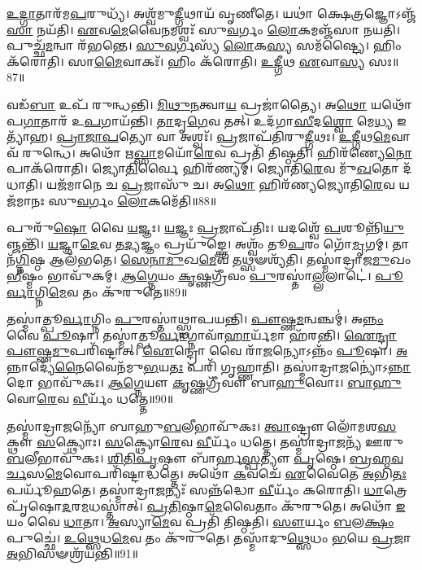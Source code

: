 \-\ul{𑌉}\-\-\ul{𑌦𑍍𑌗𑌾}\-𑌤𑌾𑌰᳴𑌮\-\ul{𑌪}\-𑌰𑍁𑌧𑍍𑌯᳴।
𑌅𑌶𑍍𑌵᳴𑌮𑍁\-\ul{𑌦𑍍𑌗𑍀}\-𑌥𑌾𑌯᳴ 𑌵𑍃𑌣𑍀𑌤𑍇।
𑌯𑌥𑌾॑ 𑌕𑍍𑌷𑍇\-\ul{𑌤𑍍𑌰}\-𑌜𑍍𑌞𑍋\-𑌽𑌞𑍍𑌜᳴\-\ul{𑌸𑌾} 𑌨𑌯᳴𑌤𑌿।
\-\ul{𑌏}\-𑌵\-\ul{𑌮𑍇}\-𑌵𑍈\-\ul{𑌨}\-𑌮𑌶𑍍𑌵𑌃᳴ 𑌸𑍁\-\ul{𑌵}\-𑌰𑍍𑌗𑌂 \ul{𑌲𑍋}\-𑌕𑌮𑌞𑍍𑌜᳴𑌸𑌾 𑌨𑌯𑌤𑌿।
𑌪𑍁𑌚𑍍𑌛᳴\-\ul{𑌮}\-𑌨𑍍𑌵𑌾 𑌰᳴𑌭𑌨𑍍𑌤𑍇।
\-\ul{𑌸𑍁}\-\-\ul{𑌵}\-𑌰𑍍𑌗𑌸𑍍𑌯᳴ \ul{𑌲𑍋}\-𑌕\-\ul{𑌸𑍍𑌯} 𑌸𑌮᳴𑌷𑍍𑌟𑍍𑌯𑍈।
𑌹𑌿𑌂 𑌕᳴𑌰𑍋𑌤𑌿।
𑌸𑌾\-\ul{𑌮𑍈}\-𑌵𑌾𑌕𑌃᳴।
𑌹𑌿𑌂 𑌕᳴𑌰𑍋𑌤𑌿।
\-\ul{𑌉}\-\-\ul{𑌦𑍍𑌗𑍀}\-𑌥 \ul{𑌏}\-𑌵𑌾\-\ul{𑌸𑍍𑌯} 𑌸𑌃॥87॥

𑌵𑌡᳴\-\ul{𑌬𑌾} 𑌉𑌪᳴ 𑌰𑍁𑌨𑍍𑌧𑌨𑍍𑌤𑌿।
\-\ul{𑌮𑌿}\-\-\ul{𑌥𑍁}\-\-\ul{𑌨}\-𑌤𑍍𑌵𑌾\-\ul{𑌯} 𑌪𑍍𑌰𑌜𑌾॑𑌤𑍍𑌯𑍈।
𑌅\-\ul{𑌥𑍋} 𑌯𑌥𑍋᳴𑌪\-\ul{𑌗𑌾}\-𑌤𑌾𑌰᳴ 𑌉\-\ul{𑌪}\-𑌗𑌾𑌯᳴𑌨𑍍𑌤𑌿।
\-\ul{𑌤𑌾}\-𑌦𑍃\-\ul{𑌗𑍇}\-𑌵 𑌤𑌤𑍍।
𑌉𑌦᳴𑌗𑌾\-\ul{𑌸𑍀}\-𑌦\-\ul{𑌶𑍍𑌵𑍋} 𑌮𑍇\-\ul{𑌧𑍍𑌯} 𑌇𑌤𑍍𑌯𑌾᳴𑌹।
\-\ul{𑌪𑍍𑌰𑌾}\-\-\ul{𑌜𑌾}\-\-\ul{𑌪}\-𑌤𑍍𑌯𑍋 𑌵𑌾 𑌅𑌶𑍍𑌵𑌃᳴।
\-\ul{𑌪𑍍𑌰}\-𑌜𑌾𑌪᳴𑌤𑌿𑌰𑍁\-\ul{𑌦𑍍𑌗𑍀}\-𑌥𑌃।
\-\ul{𑌉}\-\-\ul{𑌦𑍍𑌗𑍀}\-𑌥\-\ul{𑌮𑍇}\-𑌵𑌾𑌵᳴ 𑌰𑍁𑌨𑍍𑌧𑍇।
𑌅𑌥𑍋᳴ 𑌋\-\ul{𑌖𑍍𑌸𑌾}\-𑌮𑌯𑍋᳴\-\ul{𑌰𑍇}\-𑌵 𑌪𑍍𑌰𑌤𑌿᳴ 𑌤𑌿𑌷𑍍𑌠𑌤𑌿।
𑌹𑌿𑌰᳴𑌣𑍍𑌯𑍇\-\ul{𑌨𑍋}\-𑌪𑌾𑌕᳴𑌰𑍋𑌤𑌿।
𑌜𑍍𑌯𑍋\-\ul{𑌤𑌿}\-𑌰𑍍𑌵𑍈 𑌹𑌿𑌰᳴𑌣𑍍𑌯𑌮𑍍।
𑌜𑍍𑌯𑍋𑌤𑌿᳴\-\ul{𑌰𑍇}\-𑌵 𑌮𑍁᳴\-\ul{𑌖}\-𑌤𑍋 𑌦᳴𑌧𑌾𑌤𑌿।
𑌯𑌜᳴𑌮𑌾𑌨𑍇 𑌚 \ul{𑌪𑍍𑌰}\-𑌜𑌾𑌸𑍁᳴ 𑌚।
𑌅\-\ul{𑌥𑍋} 𑌹𑌿𑌰᳴𑌣𑍍𑌯𑌜𑍍𑌯𑍋𑌤𑌿\-\ul{𑌰𑍇}\-𑌵 𑌯𑌜᳴𑌮𑌾𑌨𑌃 𑌸𑍁\-\ul{𑌵}\-𑌰𑍍𑌗𑌂 \ul{𑌲𑍋}\-𑌕𑌮𑍇᳴𑌤𑌿॥88॥\anuvakamend[𑌤𑌥𑍍𑌸 \ul{𑌉}\-𑌪𑌾𑌕᳴𑌰𑍋𑌤𑌿 \ul{𑌚}\-𑌤𑍍𑌵𑌾𑌰𑌿᳴ 𑌚]

𑌪𑍁𑌰𑍁᳴\-\ul{𑌷𑍋} 𑌵𑍈 \ul{𑌯}\-𑌜𑍍𑌞𑌃।
\-\ul{𑌯}\-𑌜𑍍𑌞𑌃 \ul{𑌪𑍍𑌰}\-𑌜𑌾\-𑌪᳴𑌤𑌿𑌃।
𑌯𑌦𑌶𑍍𑌵𑍇᳴ \ul{𑌪}\-𑌶𑍂𑌨𑍍𑌨𑌿᳴\-\ul{𑌯𑍁}\-𑌞𑍍𑌜𑌨𑍍𑌤𑌿᳴।
\-\ul{𑌯}\-𑌜𑍍𑌞𑌾\-\ul{𑌦𑍇}\-𑌵 𑌤\-\ul{𑌦𑍍𑌯}\-𑌜𑍍𑌞𑌂 𑌪𑍍𑌰𑌯𑍁᳴𑌙𑍍𑌕𑍍𑌤𑍇।
𑌅𑌶𑍍𑌵𑌂᳴ 𑌤𑍂\-\ul{𑌪}\-𑌰𑌂 𑌗𑍋᳴\-\ul{𑌮𑍃}\-𑌗𑌮𑍍।
𑌤𑌾𑌨᳴\-\ul{𑌗𑍍𑌨𑌿}\-𑌷𑍍𑌠 𑌆𑌲᳴𑌭𑌤𑍇।
\-\ul{𑌸𑍇}\-\-\ul{𑌨𑌾}\-\-\ul{𑌮𑍁}\-𑌖\-\ul{𑌮𑍇}\-𑌵 𑌤𑌥𑍍𑌸𑍟𑌶𑍍𑌯᳴𑌤𑌿।
𑌤𑌸𑍍𑌮𑌾॑𑌦𑍍𑌰𑌾𑌜\-\ul{𑌮𑍁}\-𑌖𑌂 \ul{𑌭𑍀}\-𑌷𑍍𑌮𑌂 𑌭𑌾𑌵𑍁᳴𑌕𑌮𑍍।
\-\ul{𑌆}\-\-\ul{𑌗𑍍𑌨𑍇}\-𑌯𑌂 \ul{𑌕𑍃}\-𑌷𑍍𑌣𑌗𑍍𑌰𑍀᳴𑌵𑌂 \ul{𑌪𑍁}\-𑌰𑌸𑍍𑌤𑌾॑\-\ul{𑌲𑍍𑌲}\-𑌲𑌾𑌟𑍇॑।
\-\ul{𑌪𑍂}\-\-\ul{𑌰𑍍𑌵𑌾}\-𑌗𑍍𑌨𑌿\-\ul{𑌮𑍇}\-𑌵 𑌤𑌂 𑌕𑍁᳴𑌰𑍁𑌤𑍇॥89॥

𑌤𑌸𑍍𑌮𑌾॑𑌤𑍍𑌪𑍂\-\ul{𑌰𑍍𑌵𑌾}\-𑌗𑍍𑌨𑌿𑌂 \ul{𑌪𑍁}\-𑌰𑌸𑍍𑌤𑌾॑𑌥𑍍𑌸𑍍𑌥𑌾𑌪𑌯𑌨𑍍𑌤𑌿।
\-\ul{𑌪𑍗}\-𑌷𑍍𑌣\-\ul{𑌮}\-𑌨𑍍𑌵𑌞𑍍𑌚𑌮𑍍॑।
𑌅\-\ul{𑌨𑍍𑌨𑌂} 𑌵𑍈 \ul{𑌪𑍂}\-𑌷𑌾।
𑌤𑌸𑍍𑌮𑌾॑𑌤𑍍𑌪𑍂\-\ul{𑌰𑍍𑌵𑌾}\-𑌗𑍍𑌨𑌾𑌵𑌾᳴\-\ul{𑌹𑌾}\-𑌰𑍍𑌯᳴𑌮𑌾 𑌹᳴𑌰𑌨𑍍𑌤𑌿।
\-\ul{𑌐}\-\-\ul{𑌨𑍍𑌦𑍍𑌰𑌾}\-\-\ul{𑌪𑍗}\-𑌷𑍍𑌣\-\ul{𑌮𑍁}\-𑌪𑌰𑌿᳴𑌷𑍍𑌟𑌾𑌤𑍍।
\-\ul{𑌐}\-𑌨𑍍𑌦𑍍𑌰𑍋 𑌵𑍈 𑌰𑌾᳴\-\ul{𑌜}\-𑌨𑍍𑌯𑍋\-𑌽𑌨𑍍𑌨𑌂᳴ \ul{𑌪𑍂}\-𑌷𑌾।
\-\ul{𑌅}\-𑌨𑍍𑌨𑌾𑌦𑍍𑌯𑍇᳴\-\ul{𑌨𑍈}\-𑌵𑍈𑌨᳴𑌮𑍁\-\ul{𑌭}\-𑌯\-\ul{𑌤𑌃} 𑌪𑌰𑌿᳴ 𑌗𑍃𑌹𑍍𑌣𑌾𑌤𑌿।
𑌤𑌸𑍍𑌮𑌾॑𑌦𑍍𑌰𑌾\-\ul{𑌜}\-𑌨𑍍𑌯𑍋॑\-𑌽\-\ul{𑌨𑍍𑌨𑌾}\-𑌦𑍋 𑌭𑌾𑌵𑍁᳴𑌕𑌃।
\-\ul{𑌆}\-\-\ul{𑌗𑍍𑌨𑍇}\-𑌯𑍗 \ul{𑌕𑍃}\-𑌷𑍍𑌣𑌗𑍍𑌰𑍀᳴𑌵𑍗 𑌬𑌾\-\ul{𑌹𑍁}\-𑌵𑍋𑌃।
\-\ul{𑌬𑌾}\-\-\ul{𑌹𑍁}\-𑌵𑍋\-\ul{𑌰𑍇}\-𑌵 \ul{𑌵𑍀}\-𑌰𑍍𑌯𑌂᳴ 𑌧𑌤𑍍𑌤𑍇॥90॥

𑌤𑌸𑍍𑌮𑌾॑𑌦𑍍𑌰𑌾\-\ul{𑌜}\-𑌨𑍍𑌯𑍋᳴ 𑌬𑌾𑌹𑍁\-\ul{𑌬}\-𑌲𑍀𑌭𑌾𑌵𑍁᳴𑌕𑌃।
\-\ul{𑌤𑍍𑌵𑌾}\-𑌷𑍍𑌟𑍍𑌰𑍗 𑌲𑍋᳴𑌮𑌶\-\ul{𑌸}\-𑌕𑍍𑌥𑍗 \ul{𑌸}\-𑌕𑍍𑌥𑍍𑌯𑍋𑌃।
\-\ul{𑌸}\-𑌕𑍍𑌥𑍍𑌯𑍋\-\ul{𑌰𑍇}\-𑌵 \ul{𑌵𑍀}\-𑌰𑍍𑌯𑌂᳴ 𑌧𑌤𑍍𑌤𑍇।
𑌤𑌸𑍍𑌮𑌾॑𑌦𑍍𑌰𑌾\-\ul{𑌜}\-𑌨𑍍𑌯᳴ 𑌊𑌰𑍁\-\ul{𑌬}\-𑌲𑍀𑌭𑌾𑌵𑍁᳴𑌕𑌃।
\-\ul{𑌶𑌿}\-\-\ul{𑌤𑌿}\-\-\ul{𑌪𑍃}\-𑌷𑍍𑌠𑍗 𑌬𑌾᳴𑌰𑍍\mbox{}𑌹\-\ul{𑌸𑍍𑌪}\-𑌤𑍍𑌯𑍗 \ul{𑌪𑍃}\-𑌷𑍍𑌠𑍇।
\-\ul{𑌬𑍍𑌰}\-\-\ul{𑌹𑍍𑌮}\-\-\ul{𑌵}\-\-\ul{𑌰𑍍𑌚}\-𑌸\-\ul{𑌮𑍇}\-𑌵𑍋𑌪𑌰𑌿᳴𑌷𑍍𑌟𑌾𑌦𑍍𑌧𑌤𑍍𑌤𑍇।
𑌅𑌥𑍋᳴ \ul{𑌕}\-𑌵𑌚𑍇᳴ \ul{𑌏}\-𑌵𑍈𑌤𑍇 \ul{𑌅}\-𑌭𑌿\-\ul{𑌤𑌃} 𑌪𑌰𑍍𑌯𑍂᳴𑌹𑌤𑍇।
𑌤𑌸𑍍𑌮𑌾॑𑌦𑍍𑌰𑌾\-\ul{𑌜}\-𑌨𑍍𑌯𑌃᳴ 𑌸𑌨𑍍𑌨᳴𑌦𑍍𑌧𑍋 \ul{𑌵𑍀}\-𑌰𑍍𑌯𑌂᳴ 𑌕𑌰𑍋𑌤𑌿।
\-\ul{𑌧𑌾}\-𑌤𑍍𑌰𑍇 𑌪𑍃᳴𑌷𑍋\-\ul{𑌦}\-𑌰\-\ul{𑌮}\-𑌧𑌸𑍍𑌤𑌾॑𑌤𑍍।
\-\ul{𑌪𑍍𑌰}\-\-\ul{𑌤𑌿}\-𑌷𑍍𑌠𑌾\-\ul{𑌮𑍇}\-𑌵𑍈𑌤𑌾𑌂 𑌕𑍁᳴𑌰𑍁𑌤𑍇।
𑌅𑌥𑍋᳴ \ul{𑌇}\-𑌯𑌂 𑌵𑍈 \ul{𑌧𑌾}\-𑌤𑌾।
\-\ul{𑌅}\-𑌸𑍍𑌯𑌾\-\ul{𑌮𑍇}\-𑌵 𑌪𑍍𑌰𑌤𑌿᳴ 𑌤𑌿𑌷𑍍𑌠𑌤𑌿।
\-\ul{𑌸𑍗}\-𑌰𑍍𑌯𑌂 \ul{𑌬}\-𑌲\-\ul{𑌕𑍍𑌷𑌂} 𑌪𑍁𑌚𑍍𑌛𑍇॑।
\-\ul{𑌉}\-\-\ul{𑌥𑍍𑌸𑍇}\-𑌧\-\ul{𑌮𑍇}\-𑌵 𑌤𑌂 𑌕𑍁᳴𑌰𑍁𑌤𑍇।
𑌤𑌸𑍍𑌮𑌾᳴𑌦𑍁\-\ul{𑌥𑍍𑌸𑍇}\-𑌧𑌂 \ul{𑌭}\-𑌯𑍇 \ul{𑌪𑍍𑌰}\-𑌜𑌾 \ul{𑌅}\-𑌭𑌿𑌸𑍟𑌶𑍍𑌰᳴𑌯𑌨𑍍𑌤𑌿॥91॥\anuvakamend[\-\ul{𑌕𑍁}\-\-\ul{𑌰𑍁}\-\-\ul{𑌤𑍇} \ul{𑌧}\-\-\ul{𑌤𑍍𑌤𑍇} \ul{𑌕𑍁}\-\-\ul{𑌰𑍁}\-\-\ul{𑌤𑍇} 𑌪𑌞𑍍𑌚᳴ 𑌚]




